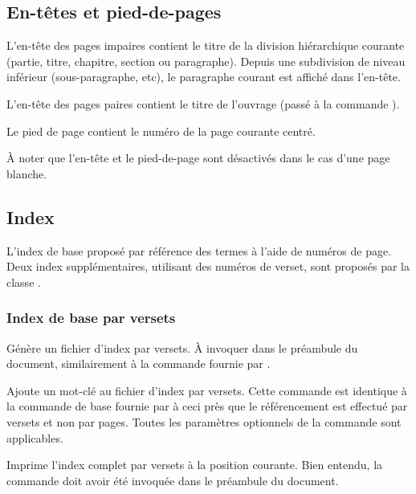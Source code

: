 \documentclass{ltxdockit}
\begin{document}
\subsection{En-têtes et pied-de-pages}
\label{entete}

L'en-tête des pages impaires contient le titre de la division hiérarchique courante (partie, titre, chapitre, section ou paragraphe). Depuis une subdivision de niveau inférieur (sous-paragraphe, etc), le paragraphe courant est affiché dans l'en-tête.

L'en-tête des pages paires contient le titre de l'ouvrage (passé à la commande ).

Le pied de page contient le numéro de la page courante centré.

À noter que l'en-tête et le pied-de-page sont désactivés dans le cas d'une page blanche.

\subsection{Index}
\label{index}

L'index de base proposé par \latex référence des termes à l'aide de numéros de page. Deux index supplémentaires, utilisant des numéros de verset, sont proposés par la classe .

\subsubsection{Index de base par versets}

\begin{ltxsyntax}


Génère un fichier d'index par versets. À invoquer dans le préambule du document, similairement à la commande  fournie par \latex.


Ajoute un mot-clé au fichier d'index par versets. Cette commande est identique à la commande de base  fournie par \latex à ceci près que le référencement est effectué par versets et non par pages. Toutes les paramètres optionnels de la commande  sont applicables.


Imprime l'index complet par versets à la position courante. Bien entendu, la commande  doit avoir été invoquée dans le préambule du document.

\end{ltxsyntax}
\end{document}
